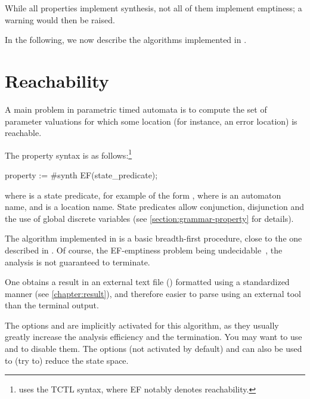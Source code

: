 While all properties implement synthesis, not all of them implement emptiness; a warning would then be raised.

In the following, we now describe the algorithms implemented in \imitator{}.

\section{Reachability}\label{ss:mode:EFsynth}

A main problem in parametric timed automata is to compute the set of parameter valuations for which some location (for instance, an error location) is reachable.

The property syntax is as follows:\footnote{%
	\imitator{} uses the TCTL syntax, where EF notably denotes reachability.
}

\begin{IMITATORproperty}
property := #synth EF(state_predicate);
\end{IMITATORproperty}


\noindent{}where  is a state predicate, for example of the form , where  is an automaton name, and  is a location name.
State predicates allow conjunction, disjunction and the use of global discrete variables (see \cref{section:grammar-property} for details).



The algorithm \EFsynth{} implemented in \imitator{} is a basic breadth-first procedure, close to the one described in \cite{JLR15}.
Of course, the EF-emptiness problem being undecidable~\cite{AHV93}, the analysis is not guaranteed to terminate.

One obtains a result in an external text file () formatted using a standardized manner (see \cref{chapter:result}), and therefore easier to parse using an external tool than the terminal output.

The options  \cite{AFS13atva} and  are implicitly activated for this algorithm, as they usually greatly increase the analysis efficiency and the termination.
You may want to use  and  to disable them.
The options  (not activated by default) and  can also be used to (try to) reduce the state space.


